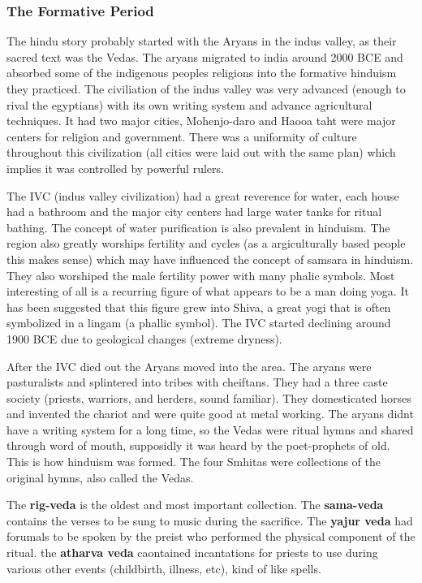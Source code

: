 \documentclass{article}
\begin{document}
\subsubsection{The Formative Period}
\label{ssub:the_formative_period}
The hindu story probably started with the Aryans in the indus valley, as their sacred text was the Vedas. The aryans migrated to india around 2000 BCE and absorbed some of the indigenous peoples religions into the formative hinduism they practiced. The civiliation of the indus valley was very advanced (enough to rival the egyptians) with its own writing system and advance agricultural techniques. It had two major cities, Mohenjo-daro and Haooa taht were major centers for religion and government. There was a uniformity of culture throughout this civilization (all cities were laid out with the same plan) which implies it was controlled by powerful rulers.

The IVC (indus valley civilization) had a great reverence for water, each house had a bathroom and the major city centers had large water tanks for ritual bathing. The concept of water purification is also prevalent in hinduism. The region also greatly worships fertility and cycles (as a argiculturally based people this makes sense) which may have influenced the concept of samsara in hinduism. They also worshiped the male fertility power with many phalic symbols. Most interesting of all is a recurring figure of what appears to be a man doing yoga. It has been suggested that this figure grew into Shiva, a great yogi that is often symbolized in a lingam (a phallic symbol). The IVC started declining around 1900 BCE due to geological changes (extreme dryness).

After the IVC died out the Aryans moved into the area. The aryans were pasturalists and splintered into tribes with cheiftans. They had a three caste society (priests, warriors, and herders, sound familiar). They domesticated horses and invented the chariot and were quite good at metal working. The aryans didnt have a writing system for  a long time, so the Vedas were ritual hymns and shared through word of mouth, supposidly it was heard by the poet-prophets of old. This is how hinduism was formed. The four Smhitas were collections of the original hymns, also called the Vedas.

The \textbf{rig-veda} is the oldest and most important collection. The \textbf{sama-veda} contains the verses to be sung to music during the sacrifice. The \textbf{yajur veda} had forumals to be spoken by the preist who performed the physical component of the ritual. the \textbf{atharva veda} caontained incantations for priests to use during various other events (childbirth, illness, etc), kind of like spells.
\end{document}
